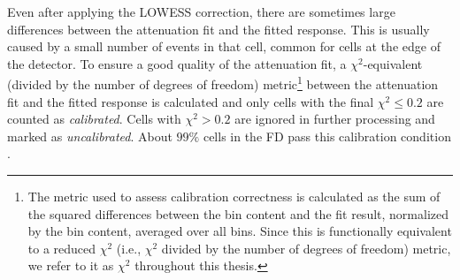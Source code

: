 Even after applying the \gls{LOWESS} correction, there are sometimes large differences between the attenuation fit and the fitted response. This is usually caused by a small number of events in that cell, common for cells at the edge of the detector. To ensure a good quality of the attenuation fit, a $\chi^2$-equivalent (divided by the number of degrees of freedom) metric\footnote{The metric used to assess calibration correctness is calculated as the sum of the squared differences between the bin content and the fit result, normalized by the bin content, averaged over all bins. Since this is functionally equivalent to a reduced $\chi^2$ (i.e., $\chi^2$ divided by the number of degrees of freedom) metric, we refer to it as $\chi^2$ throughout this thesis.} between the attenuation fit and the fitted response is calculated and only cells with the final $\chi^2\leq 0.2$ are counted as \textit{calibrated}. Cells with $\chi^2>0.2$ are ignored in further processing and marked as \textit{uncalibrated}. About $99\%$ cells in the \gls{FD} pass this calibration condition \cite{NOvA-doc-13579-Second}.




